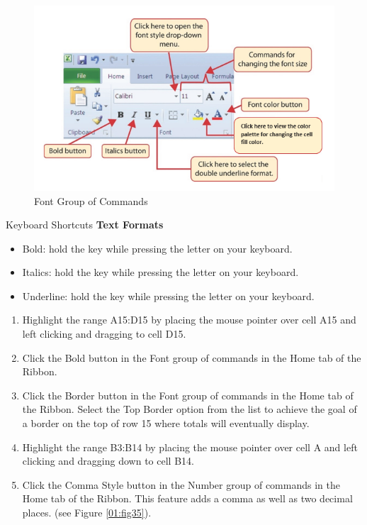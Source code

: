 \begin{figure}[H]
	\centering
	\includegraphics[width=\maxwidth{.95\linewidth}]{gfx/ch01_fig34}
	\caption{Font Group of Commands}
	\label{01:fig34}
\end{figure}

\begin{center}
	\begin{shtcutbox}{Keyboard Shortcuts}
		\textbf{Text Formats}
		\\
		\begin{itemize}
			\setlength{\itemsep}{0pt}
			\setlength{\parskip}{0pt}
			\setlength{\parsep}{0pt}
			
			\item Bold: hold the  key while pressing the letter  on your keyboard.
			\item Italics: hold the  key while pressing the letter  on your keyboard.
			\item Underline: hold the  key while pressing the letter  on your keyboard.
			
		\end{itemize}
	\end{shtcutbox}
\end{center}

\begin{enumerate}[resume]
	\item Highlight the range \textsf{A15:D15} by placing the mouse pointer over cell \textsf{A15} and left clicking and dragging to cell \textsf{D15}.
	\item Click the Bold button in the Font group of commands in the Home tab of the Ribbon.
	\item Click the Border button in the Font group of commands in the Home tab of the Ribbon. Select the Top Border option from the list to achieve the goal of a border on the top of row 15 where totals will eventually display.
	\item Highlight the range \textsf{B3:B14} by placing the mouse pointer over cell A and left clicking and dragging down to cell \textsf{B14}.
	\item Click the Comma Style button in the Number group of commands in the Home tab of the Ribbon. This feature adds a comma as well as two decimal places. (see Figure \ref{01:fig35}).
\end{enumerate}

